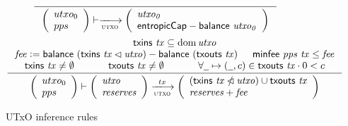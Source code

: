 \begin{figure}
  \begin{equation}\label{eq:utxo-bootstrap}
    \inference
    {
    }
    {
      {\left(\begin{array}{l}
        utxo_0\\
        pps
      \end{array}\right)}
      \vdash
      \trans{utxo}{}
      \left(
        \begin{array}{l}
          \var{utxo_0}\\
          \fun{entropicCap} - \balance{utxo_0}
        \end{array}
      \right)
    }
  \end{equation}
  \nextdef
  \begin{equation}\label{eq:utxo-inductive}
    \inference
    { \txins{tx} \subseteq \dom \var{utxo}\\
      \var{fee} \leteq \balance{(\txins{tx} \restrictdom \var{utxo})} - \balance{(\txouts{tx})}
      & \minfee{pps}{tx} \leq \var{fee}\\
      \txins{tx} \neq \emptyset
      & \txouts{tx} \neq \emptyset
      & \forall \wcard \mapsto (\wcard, c) \in \txouts{tx} \cdot 0 < c
    }
    {
      {\left(\begin{array}{l}
        utxo_0\\
        pps
       \end{array}\right)}
      \vdash
      \left(
          \begin{array}{l}
            \var{utxo}\\
            \var{reserves}
          \end{array}
      \right)
      \trans{utxo}{tx}
      \left(
        \begin{array}{l}
          (\txins{tx} \subtractdom \var{utxo}) \cup \txouts{tx}\\
          \var{reserves + \var{fee}}
        \end{array}
      \right)
    }
  \end{equation}
  \caption{UTxO inference rules}
  \label{fig:rules:utxo}
\end{figure}

